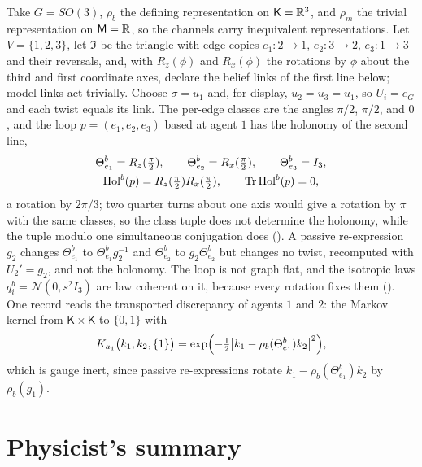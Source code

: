 Take $G=SO(3)$, $\rho_b$ the defining representation on $\mathsf K=\mathbb R^3$, and $\rho_m$ the trivial
representation on $\mathsf M=\mathbb R$, so the channels carry inequivalent representations. Let
$V=\{1,2,3\}$, let $\mathfrak I$ be the triangle with edge copies $e_1:2\to1$, $e_2:3\to2$, $e_3:1\to3$
and their reversals, and, with $R_z(\phi)$ and $R_x(\phi)$ the rotations by $\phi$ about the third and
first coordinate axes, declare the belief links of the first line below; model links act trivially.
Choose $\sigma=u_1$ and, for display, $u_2=u_3=u_1$, so $U_i=e_G$ and each twist equals its link. The
per-edge classes are the angles $\pi/2$, $\pi/2$, and $0$, and the loop $p=(e_1,e_2,e_3)$ based at
agent $1$ has the holonomy of the second line,
\begin{gather}
\Theta_{e_1}^b=R_z(\tfrac\pi2),
\qquad
\Theta_{e_2}^b=R_x(\tfrac\pi2),
\qquad
\Theta_{e_3}^b=I_3,
\label{eq:geo-running-links}\\
\mathrm{Hol}^b(p)=R_z(\tfrac\pi2)R_x(\tfrac\pi2),
\qquad
\operatorname{Tr}\mathrm{Hol}^b(p)=0,
\label{eq:geo-running-holonomy}
\end{gather}
a rotation by $2\pi/3$; two quarter turns about one axis would give a rotation by $\pi$ with the same
classes, so the class tuple does not determine the holonomy, while the tuple modulo one simultaneous
conjugation does (). A passive re-expression $g_2$ changes
$\Theta_{e_1}^b$ to $\Theta_{e_1}^bg_2^{-1}$ and $\Theta_{e_2}^b$ to $g_2\Theta_{e_2}^b$ but changes no
twist, recomputed with $U_2'=g_2$, and not the holonomy. The loop is not graph flat, and the isotropic
laws $q_i^b=\mathcal N(0,s^2I_3)$ are law coherent on it, because every rotation fixes them
(). One record reads the transported discrepancy of agents $1$ and $2$:
the Markov kernel from $\mathsf K\times\mathsf K$ to $\{0,1\}$ with
\begin{equation}
K_{a_1}\bigl(k_1,k_2,\{1\}\bigr)=\exp\Bigl(-\tfrac12\bigl\lvert k_1-\rho_b(\Theta_{e_1}^b)k_2\bigr\rvert^2\Bigr),
\label{eq:geo-running-record}
\end{equation}
which is gauge inert, since passive re-expressions rotate $k_1-\rho_b(\Theta_{e_1}^b)k_2$ by
$\rho_b(g_1)$.

\section*{Physicist's summary}

